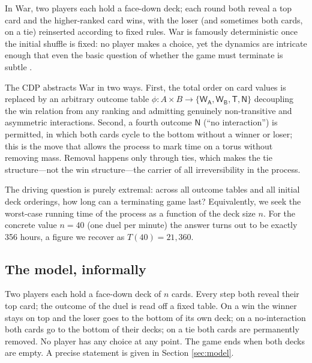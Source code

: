 \documentclass[11pt]{article}
\theoremstyle{definition}
\theoremstyle{remark}
\newcommand{\WA}{\mathsf{W_A}}
\newcommand{\WB}{\mathsf{W_B}}
\newcommand{\TT}{\mathsf{T}}
\newcommand{\NN}{\mathsf{N}}
\begin{document}
In War, two players each hold a face-down deck; each round both reveal a top card and the higher-ranked card wins, with the loser (and sometimes both cards, on a tie) reinserted according to fixed rules. War is famously deterministic once the initial shuffle is fixed: no player makes a choice, yet the dynamics are intricate enough that even the basic question of whether the game must terminate is subtle \cite{LR}. 

The CDP abstracts War in two ways. First, the total order on card values is replaced by an arbitrary outcome table $\phi:A\times B\rightarrow\{\WA,\WB,\TT,\NN\}$ decoupling the win relation from any ranking and admitting genuinely non-transitive and asymmetric interactions. Second, a fourth outcome $\NN$ (``no interaction'') is permitted, in which both cards cycle to the bottom without a winner or loser; this is the move that allows the process to mark time on a torus without removing mass. Removal happens only through ties, which makes the tie structure---not the win structure---the carrier of all irreversibility in the process. 

The driving question is purely extremal: across all outcome tables and all initial deck orderings, how long can a terminating game last? Equivalently, we seek the worst-case running time of the process as a function of the deck size $n$. For the concrete value $n=40$ (one duel per minute) the answer turns out to be exactly 356 hours, a figure we recover as $T(40) = 21,360$.

\subsection{The model, informally}
Two players each hold a face-down deck of $n$ cards. Every step both reveal their top card; the outcome of the duel is read off a fixed table. On a win the winner stays on top and the loser goes to the bottom of its own deck; on a no-interaction both cards go to the bottom of their decks; on a tie both cards are permanently removed. No player has any choice at any point. The game ends when both decks are empty. A precise statement is given in Section \ref{sec:model}.
\end{document}

